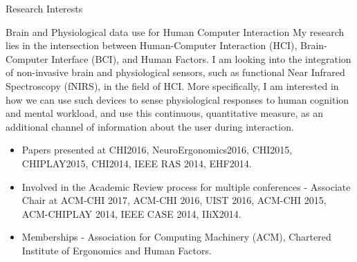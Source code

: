 \documentclass{resume} %
\begin{document}
	\begin{rSection}{Research Interests}
		\begin{rSubsection}{Brain and Physiological data use for Human Computer Interaction}{ }{ }{ }
			\vspace{-5 mm}
			My research lies in the intersection between Human-Computer Interaction (HCI), Brain-Computer Interface (BCI), and Human Factors. I am looking into the integration of non-invasive brain and physiological sensors, such as functional Near Infrared Spectroscopy (fNIRS), in the field of HCI. More specifically, I am interested in how we can use such devices to sense physiological responses to human cognition and mental workload, and use this continuous, quantitative measure, as an additional channel of information about the user during interaction.
			
			\begin{itemize}
				\item Papers presented at CHI2016, NeuroErgonomics2016, CHI2015, CHIPLAY2015, CHI2014, IEEE RAS 2014, EHF2014.
				\item Involved in the Academic Review process for multiple conferences - Associate Chair at ACM-CHI 2017, ACM-CHI 2016, UIST 2016, ACM-CHI 2015, ACM-CHIPLAY 2014, IEEE CASE 2014, IIiX2014.
				\item  Memberships - Association for Computing Machinery (ACM), Chartered Institute of Ergonomics and Human Factors.
			\end{itemize}
			
		\end{rSubsection}
		
	\end{rSection}
\end{document}
